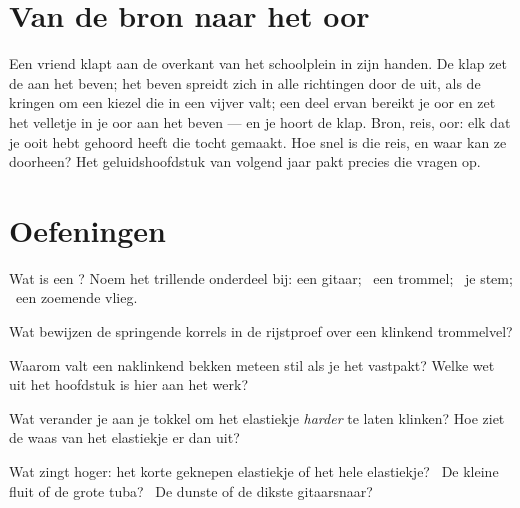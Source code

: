 \section{Van de bron naar het oor}

\begin{example}\label{ex:g3:sound-around-us:journey}
Een vriend klapt aan de overkant van het schoolplein in zijn handen.
De klap zet de  aan het beven; het beven spreidt zich in alle
richtingen door de  uit, als de kringen om een kiezel die in een
vijver valt; een deel ervan bereikt je oor en zet het velletje in je
oor aan het beven --- en je hoort de klap. Bron, reis, oor: elk
 dat je ooit hebt gehoord heeft die tocht gemaakt. Hoe snel is
die reis, en waar kan ze doorheen? Het geluidshoofdstuk van volgend
jaar pakt precies die vragen op.
\end{example}

\section{Oefeningen}

\begin{exercise}[$\star$]\label{exo:g3:sound-around-us:1}
Wat is een ? Noem het trillende onderdeel bij: een gitaar; \
een trommel; \ je stem; \ een zoemende vlieg.
\end{exercise}

\begin{exercise}[$\star$]\label{exo:g3:sound-around-us:2}
Wat bewijzen de springende korrels in de rijstproef over een klinkend
trommelvel?
\end{exercise}

\begin{exercise}[$\star$]\label{exo:g3:sound-around-us:3}
Waarom valt een naklinkend bekken meteen stil als je het vastpakt?
Welke wet uit het hoofdstuk is hier aan het werk?
\end{exercise}

\begin{exercise}[$\star$]\label{exo:g3:sound-around-us:4}
Wat verander je aan je tokkel om het elastiekje \emph{harder} te laten
klinken? Hoe ziet de waas van het elastiekje er dan uit?
\end{exercise}

\begin{exercise}[$\star$]\label{exo:g3:sound-around-us:5}
Wat zingt hoger: het korte geknepen elastiekje of het hele elastiekje?
\ De kleine fluit of de grote tuba? \ De dunste of de dikste
gitaarsnaar?
\end{exercise}

